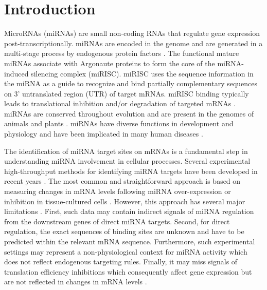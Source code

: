 \chapter{Introduction}
\label{chap:intro}

MicroRNAs (miRNAs) are small non-coding RNAs that regulate gene expression post-transcriptionally. miRNAs are encoded in the genome and are generated in a multi-stage process by endogenous protein factors \cite{finnegan2013microrna}. The functional mature miRNAs associate with Argonaute proteins to form the core of the miRNA-induced silencing complex (miRISC). miRISC uses the sequence information in the miRNA as a guide to recognize and bind partially complementary sequences on 3' untranslated region (UTR) of target mRNAs. miRISC binding typically leads to translational inhibition and/or degradation of targeted mRNAs \cite{huntzinger2011gene}. 
miRNAs are conserved throughout evolution and are present in the genomes of animals and plants \cite{kozomara2013mirbase}. miRNAs have diverse functions in development and physiology and have been implicated in many human diseases \cite{rupaimoole2017microrna}.

The identification of miRNA target sites on mRNAs is a fundamental step in understanding miRNA involvement in cellular processes. Several experimental high-throughput methods for identifying miRNA targets have been developed in recent years \cite{li2019current, martinez2013microrna}.
The most common and straightforward approach is based on measuring changes in mRNA levels following miRNA over-expression or inhibition in tissue-cultured cells \cite{thomas2010desperately}. However, this approach has several major limitations \cite{li2019current, martinez2013microrna}. First, such data may contain indirect signals of miRNA regulation from the downstream genes of direct miRNA targets. Second, for direct regulation, the exact sequences of binding sites are unknown and have to be predicted within the relevant mRNA sequence. Furthermore, such experimental settings may represent a non-physiological context for miRNA activity which does not reflect endogenous targeting rules. Finally, it may miss signals of translation efficiency inhibitions which consequently affect gene expression but are not reflected in changes in mRNA levels \cite{fabian2010regulation}.


